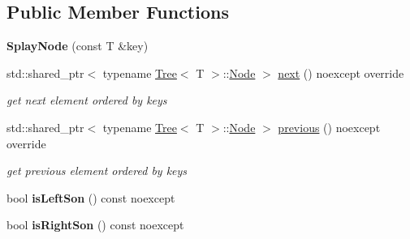 \subsection*{Public Member Functions}
\begin{DoxyCompactItemize}
\item 
\mbox{\label{classSplayTree_1_1SplayNode_af613da62a8442f16ac8b4d2f1a2c9a41}} 
{\bfseries Splay\+Node} (const T \&key)
\item 
std\+::shared\+\_\+ptr$<$ typename \hyperlink{classTree}{Tree}$<$ T $>$\+::\hyperlink{classTree_1_1Node}{Node} $>$ \hyperlink{classSplayTree_1_1SplayNode_a958decc1fc4c1c2aa4c80c5fc4e42acd}{next} () noexcept override
\begin{DoxyCompactList}\small\item\em get next element ordered by keys \end{DoxyCompactList}\item 
std\+::shared\+\_\+ptr$<$ typename \hyperlink{classTree}{Tree}$<$ T $>$\+::\hyperlink{classTree_1_1Node}{Node} $>$ \hyperlink{classSplayTree_1_1SplayNode_a6a89136b18f560485a4bda43ef15f560}{previous} () noexcept override
\begin{DoxyCompactList}\small\item\em get previous element ordered by keys \end{DoxyCompactList}\item 
\mbox{\label{classSplayTree_1_1SplayNode_ac057d0b4f3e979f4145e4690c8edc343}} 
bool {\bfseries is\+Left\+Son} () const noexcept
\item 
\mbox{\label{classSplayTree_1_1SplayNode_a650c250d2034ffea6db16daf30114ad3}} 
bool {\bfseries is\+Right\+Son} () const noexcept
\end{DoxyCompactItemize}
